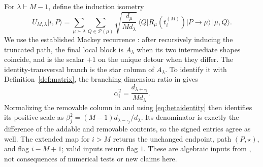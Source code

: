 \documentclass[11pt]{article}
\theoremstyle{definition}
\newcommand{\ket}[1]{\lvert #1\rangle}
\newcommand{\bra}[1]{\langle #1\rvert}
\begin{document}
For $\lambda\vdash M-1$, define the induction isometry
\begin{equation}\label{eq:ind}
 U_{M,\lambda}\ket{i,P}=
 \sum_{\mu\succ\lambda}\sum_{Q\in\mathcal P(\mu)}
 \sqrt{\frac{d_\mu}{M d_\lambda}}\,
 \bra Q R_\mu(t_i^{(M)})\ket{P\to\mu}\,\ket{\mu,Q}.
\end{equation}
We use the established Mackey recurrence \cite[Eq.~(66)]{BGO}:
after recursively inducing the truncated path, the final local block
is $A_\lambda$ when its two intermediate shapes coincide, and is the
scalar $+1$ on the unique detour when they differ. The identity-transversal
branch is the star column of $A_\lambda$. To identify it with
Definition~\ref{def:matrix}, the branching dimension ratio in
\cite[Lemma 2.4]{BGO} gives
\[
 \alpha_i^2=\frac{d_{\lambda+\square_i}}{M d_\lambda}.
\]
Normalizing the removable column in \cite[Eq.~(64)]{BGO} and using
\eqref{eq:betaidentity} then identifies its positive scale as
$\beta_j^2=(M-1)d_{\lambda-\square_j}/d_\lambda$.
Its denominator is exactly the difference of the addable and removable
contents, so the signed entries agree as well. The extended
map for $i>M$ returns the unchanged endpoint, path $(P,\star)$, and flag
$i-M+1$; valid inputs return flag $1$. These are algebraic inputs from
\cite{BGO}, not consequences of numerical tests or new claims here.
\end{document}
